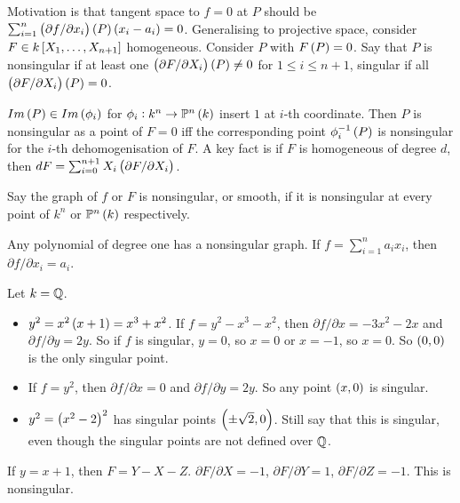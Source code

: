 Motivation is that tangent space to $ f = 0 $ at $ P $ should be $ \sum_{i = 1}^n \br{\partial f / \partial x_i}\br{P}\br{x_i - a_i} = 0 $. Generalising to projective space, consider $ F \in k\sbr{X_1, \dots, X_{n + 1}} $ homogeneous. Consider $ P $ with $ F\br{P} = 0 $. Say that $ P $ is nonsingular if at least one $ \br{\partial F / \partial X_i}\br{P} \ne 0 $ for $ 1 \le i \le n + 1 $, singular if all $ \br{\partial F / \partial X_i}\br{P} = 0 $.

\begin{fact*}
$ Im\br{P} \in Im\br{\phi_i} $ for $ \phi_i : k^n \to \P^n\br{k} $ insert $ 1 $ at $ i $-th coordinate. Then $ P $ is nonsingular as a point of $ F = 0 $ iff the corresponding point $ \phi_i^{-1}\br{P} $ is nonsingular for the $ i $-th dehomogenisation of $ F $. A key fact is if $ F $ is homogeneous of degree $ d $, then $ dF = \sum_{i = 0}^{n + 1} X_i\br{\partial F / \partial X_i} $.
\end{fact*}

\begin{definition}
Say the graph of $ f $ or $ F $ is nonsingular, or smooth, if it is nonsingular at every point of $ k^n $ or $ \P^n\br{k} $ respectively.
\end{definition}

\begin{example*}
Any polynomial of degree one has a nonsingular graph. If $ f = \sum_{i = 1}^n a_ix_i $, then $ \partial f / \partial x_i = a_i $.
\end{example*}

\begin{example*}
Let $ k = \mathbb{Q} $.
\begin{itemize}
\item $ y^2 = x^2\br{x + 1} = x^3 + x^2 $. If $ f = y^2 - x^3 - x^2 $, then $ \partial f / \partial x = -3x^2 - 2x $ and $ \partial f / \partial y = 2y $. So if $ f $ is singular, $ y = 0 $, so $ x = 0 $ or $ x = -1 $, so $ x = 0 $. So $ \br{0, 0} $ is the only singular point.
\item If $ f = y^2 $, then $ \partial f / \partial x = 0 $ and $ \partial f / \partial y = 2y $. So any point $ \br{x, 0} $ is singular.
\item $ y^2 = \br{x^2 - 2}^2 $ has singular points $ \br{\pm \sqrt{2}, 0} $. Still say that this is singular, even though the singular points are not defined over $ \mathbb{Q} $.
\end{itemize}
\end{example*}

\begin{example*}
If $ y = x + 1 $, then $ F = Y - X - Z $. $ \partial F / \partial X = -1 $, $ \partial F / \partial Y = 1 $, $ \partial F / \partial Z = -1 $. This is nonsingular.
\end{example*}

